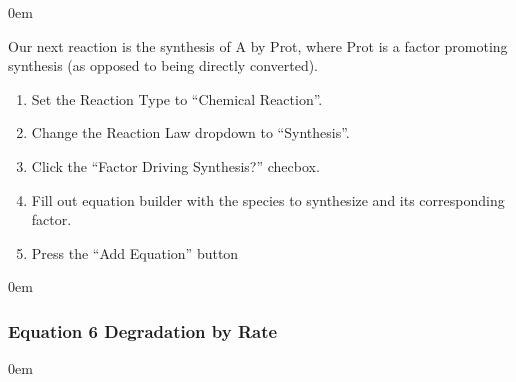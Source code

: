 \documentclass[letterpaper,10pt,english]{sphinxmanual}
\begin{document}
\begin{DUlineblock}{0em}
\item[] 
\end{DUlineblock}

\sphinxAtStartPar
Our next reaction is the synthesis of A by Prot, where Prot is a factor
promoting synthesis (as opposed to being directly converted).
\begin{enumerate}
%
\item {} 
\sphinxAtStartPar
Set the Reaction Type to “Chemical Reaction”.

\item {} 
\sphinxAtStartPar
Change the Reaction Law dropdown to “Synthesis”.

\item {} 
\sphinxAtStartPar
Click the “Factor Driving Synthesis?” checbox.

\item {} 
\sphinxAtStartPar
Fill out equation builder with the species to synthesize and its
corresponding factor.

\item {} 
\sphinxAtStartPar
Press the “Add Equation” button

\end{enumerate}


\begin{DUlineblock}{0em}
\item[] 
\end{DUlineblock}


\subsubsection{Equation 6 \sphinxhyphen{} Degradation by Rate}
\label{\detokenize{pages/tutorial_sc/createEquations:equation-6-degradation-by-rate}}

\begin{DUlineblock}{0em}
\item[] 
\end{DUlineblock}
\end{document}

